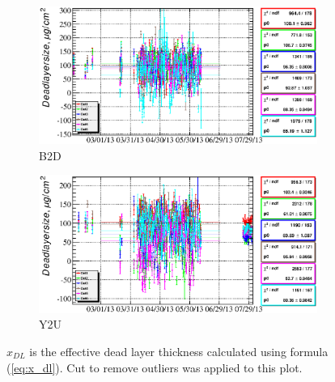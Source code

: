 \documentclass[a4paper,12pt]{article}
\begin{document}
\newcommand\xdllabel{$x_{DL}$ is the effective dead layer thickness calculated using formula (\ref{eq:x_dl}). Cut to remove
outliers was applied to this plot.}
\begin{figure}
\begin{subfigure}[b]{0.5\textwidth}
\includegraphics[width=\textwidth]{gfx/run13_alpha_study/B2D/c_chDeadLayerSize_by_day_B2D.eps}
\caption{B2D}
\end{subfigure}
%
\begin{subfigure}[b]{0.5\textwidth}
\includegraphics[width=\textwidth]{gfx/run13_alpha_study/Y2U/c_chDeadLayerSize_by_day_Y2U.eps}
\caption{Y2U}
\end{subfigure}
\caption{\xdllabel{}}
\label{fig:x_dl}
\end{figure}
\end{document}
